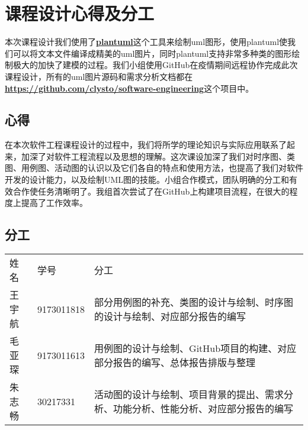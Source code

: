 \documentclass[lang=cn,11pt,a4paper,cite=authoryear]{elegantpaper}
\begin{document}
\section{课程设计心得及分工}

本次课程设计我们使用了\href{https://plantuml.com/zh/}{\textbf{plantuml}}这个工具来绘制uml图形，使用plantuml使我们可以将文本文件编译成精美的uml图片，同时plantuml支持非常多种类的图形绘制极大的加快了建模的过程。我们小组使用GitHub在疫情期间远程协作完成此次课程设计，所有的uml图片源码和需求分析文档都在\href{https://github.com/clysto/software-engineering}{\textbf{https://github.com/clysto/software-engineering}}这个项目中。

\subsection{心得}

在本次软件工程课程设计的过程中，我们将所学的理论知识与实际应用联系了起来，加深了对软件工程流程以及思想的理解。这次课设加深了我们对时序图、类图、用例图、活动图的认识以及它们各自的特点和使用方法，也提高了我们对软件开发的设计能力，以及绘制UML图的技能。小组合作模式，团队明确的分工和有效合作使任务清晰明了。我组首次尝试了在GitHub上构建项目流程，在很大的程度上提高了工作效率。


\subsection{分工}

\noindent
\begin{tabular}{@{}llp{10cm}}
    姓名 & 学号 & 分工\\ 
    王宇航 & 9173011818 &  部分用例图的补充、类图的设计与绘制、时序图的设计与绘制、对应部分报告的编写\\ 
    毛亚琛 & 9173011613 &  用例图的设计与绘制、GitHub项目的构建、对应部分报告的编写、总体报告排版与整理\\ 
    朱志畅 & 30217331   &  活动图的设计与绘制、项目背景的提出、需求分析、功能分析、性能分析、对应部分报告的编写\\ 
\end{tabular}
\end{document}
